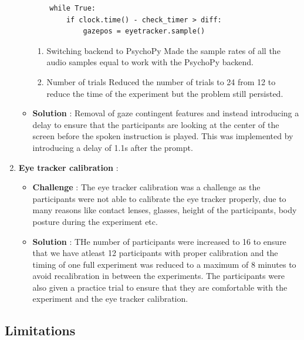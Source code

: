 \documentclass[
  a4paper,
]{article}
\providecommand{\tightlist}{%
  \setlength{\itemsep}{0pt}\setlength{\parskip}{0pt}}\usepackage{longtable,booktabs,array}
\begin{document}
\begin{enumerate}
\begin{itemize}
\begin{verbatim}
    while True:
        if clock.time() - check_timer > diff:
            gazepos = eyetracker.sample()
\end{verbatim}

    \begin{enumerate}
    \def\labelenumii{\arabic{enumii}.}
    \setcounter{enumii}{2}
    \item
      Switching backend to PsychoPy Made the sample rates of all the
      audio samples equal to work with the PsychoPy backend.
    \item
      Number of trials Reduced the number of trials to 24 from 12 to
      reduce the time of the experiment but the problem still persisted.
    \end{enumerate}
  \item
    \textbf{Solution} : Removal of gaze contingent features and instead
    introducing a delay to ensure that the participants are looking at
    the center of the screen before the spoken instruction is played.
    This was implemented by introducing a delay of 1.1s after the
    prompt.
  \end{itemize}
\item
  \textbf{Eye tracker calibration} :

  \begin{itemize}
  \tightlist
  \item
    \textbf{Challenge} : The eye tracker calibration was a challenge as
    the participants were not able to calibrate the eye tracker
    properly, due to many reasons like contact lenses, glasses, height
    of the participants, body posture during the experiment etc.
  \item
    \textbf{Solution} : THe number of participants were increased to 16
    to ensure that we have atleast 12 participants with proper
    calibration and the timing of one full experiment was reduced to a
    maximum of 8 minutes to avoid recalibration in between the
    experiments. The participants were also given a practice trial to
    ensure that they are comfortable with the experiment and the eye
    tracker calibration.
  \end{itemize}
\end{enumerate}

\hypertarget{limitations}{%
\subsection{Limitations}\label{limitations}}
\end{document}

